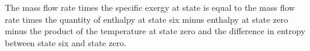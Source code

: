 The mass flow rate times the specific exergy at state is equal to the mass flow rate times the quantity of enthalpy at state six minus enthalpy at state zero minus the product of the temperature at state zero and the difference in entropy between state six and state zero.
